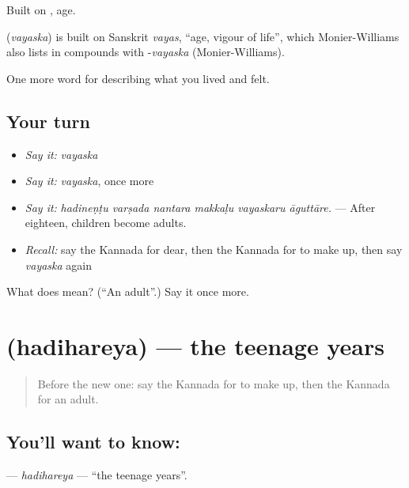 Built on , age.

\begin{cousinweb}
\textbf{} (\emph{vayaska}) is built on Sanskrit \emph{vayas}, \textquotedblleft{}age, vigour of life\textquotedblright{}, which Monier-Williams also lists in compounds with -\emph{vayaska} (Monier-Williams).
\end{cousinweb}

\begin{grammarlens}[title={What you've built}]
One more word for describing what you lived and felt.
\end{grammarlens}

\subsection*{Your turn}
\begin{itemize}
\raggedright
  \item \emph{Say it:} \emph{vayaska}
  \item \emph{Say it:} \emph{vayaska}, once more
  \item \emph{Say it:} \emph{hadineṇṭu varṣada nantara makkaḷu vayaskaru āguttāre.} — After eighteen, children become adults.
  \item \emph{Recall:} say the Kannada for dear, then the Kannada for to make up, then say \emph{vayaska} again
\end{itemize}

\begin{tcolorbox}[breakable,colback=teal!4,colframe=teal!35!black,title={Before you move on}]
What does  mean? (\textquotedblleft{}An adult\textquotedblright{}.) Say it once more.
\end{tcolorbox}
\section[\texorpdfstring{\kn{ಹದಿಹರೆಯ} (hadihareya)}{ಹದಿಹರೆಯ (hadihareya)}]{ (hadihareya) — the teenage years}

\label{lesson:KA-C529-hadihareya}



\begin{quote}
Before the new one: say the Kannada for to make up, then the Kannada for an adult.
\end{quote}

\subsection*{You'll want to know: }
\textbf{} — \emph{hadihareya} — \textquotedblleft{}the teenage years\textquotedblright{}.

